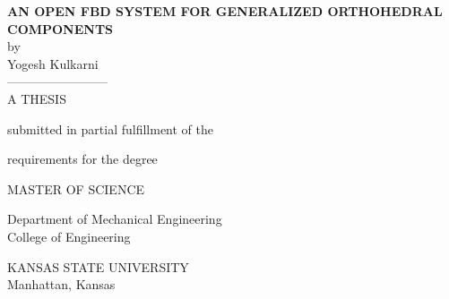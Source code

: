 \thispagestyle{empty}
\begin{center}
{\large\bf\uppercase\expandafter{An Open FBD System For Generalized
	Orthohedral Components}}\\
\vspace{0.3in}
by \\
\vspace{0.2in}
Yogesh Kulkarni\\
\vspace{.1in}
------------------------\\
\vspace{.15in}
A THESIS
\end{center}
\vspace{0.2in}
\begin{center}
submitted in partial fulfillment of the
\end{center}
\begin{center}
requirements for the degree
\end{center}
\vspace{0.2in}
\begin{center}
MASTER OF SCIENCE
\end{center}
\vspace{0.2in}
\begin{center}
Department of Mechanical Engineering \\
College of Engineering
\end{center}
\vspace{0.2in}
\begin{center}
KANSAS STATE UNIVERSITY \\
Manhattan, Kansas
\end{center}

